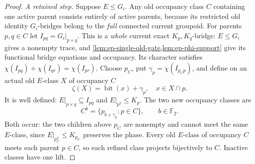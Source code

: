 \begin{proof}
\emph{A retained step.}
Suppose \(E\le G_i\).
Any old occupancy class \(C\) containing one active
parent consists entirely of active parents, because
its restricted old identity \(G_i\)-bridges belong to
the \emph{full} connected current groupoid.
For parents \(p,q\in C\) let
\(I_{pq}=G_i|_{p\times q}\). This is a
\emph{whole} current exact \(K_p,K_q\)-bridge:
\(E\le G_i\) gives a nonempty trace, and
\cref{lem:ep-single-old-gate,lem:ep-phi-support}
give its functional bridge equations and occupancy.
Its character satisfies
\(\chi(I_{pq})+\chi(I_{qr})=\chi(I_{pr})\).
Choose \(p_C\), put \(\gamma_p=\chi(I_{p_Cp})\), and
define on an actual old \(E\)-class \(X\) of occupancy \(C\)
\[
  \zeta(X)=\operatorname{bit}(x)+\gamma_p,
  \quad x\in X\cap p.
 \tag{E8}\label{eq:ep-gamma}
\]
It is well defined: \(E|_{p\times q}\subseteq I_{pq}\)
and \(E|_{p^2}\le K_p\).
The two new occupancy classes are
\[
  C^b=\{p_{b+\gamma_p}:p\in C\},
            \qquad b\in\mathbb F_2 .
 \tag{E9}\label{eq:ep-graph-offsets}
\]
Both occur: the two children above \(p_C\)
are nonempty and cannot meet the same \(E\)-class,
since \(E|_{p_C^2}\le K_{p_C}\) preserves the phase.
Every old \(E\)-class of occupancy \(C\) meets each
parent \(p\in C\), so each refined class projects
bijectively to \(C\). Inactive classes have one lift.


\end{proof}
